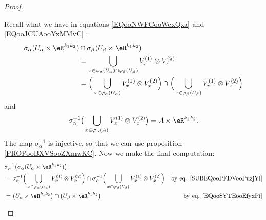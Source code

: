 \begin{proof}
\begin{subproof}
\begin{subproof}
			Recall what we have in equations \eqref{EQooNWFCooWcxQxa} and \eqref{EQooJCUAooYxMMvC} :
			\begin{subequations}
				\begin{align}
					\sigma_{\alpha}(U_{\alpha}\times \eR^{k_1k_2}) & \cap \sigma_{\beta}(U_{\beta}\times \eR^{k_1k_2})                                                                                                                                                  \\
					                                               & =\bigcup_{x\in \varphi_{\alpha}(U_{\alpha})\cap \varphi_{\beta}(U_{\beta})}V_x^{(1)}\otimes V_x^{(2)}                                                                                              \\
					                                               & = \Big( \bigcup_{x\in \varphi_{\alpha}(U_{\alpha})}V_x^{(1)}\otimes V_x^{(2)} \Big)\cap\Big( \bigcup_{x\in \varphi_{\beta}(U_{\beta})}V_x^{(1)}\otimes V_x^{(2)}  \Big)		\label{SUBEQooPFDVooPuzjYl}
				\end{align}
			\end{subequations}
			and
			\begin{equation}		\label{EQooSYTEooEfyxPi}
				\sigma_{\alpha}^{-1}\big( \bigcup_{x\in \varphi_{\alpha}(A)}V_x^{(1)}\otimes V_x^{(2)} \big)    =A\times \eR^{k_1k_2}.
			\end{equation}
			The map \( \sigma_{\alpha}^{-1}\) is injective, so that we can use proposition \ref{PROPooBXVSooZXmwKC}. Now we make the final computation:
			\begin{subequations}
				\begin{align}
					 & \sigma_{\alpha}^{-1}\big( \sigma_{\alpha}(U_{\alpha}\times \eR^{k_1k_2})  \big)                                                                                                                                                                                    \\
					 & = \sigma_{\alpha}^{-1}\Big(  \bigcup_{x\in \varphi_{\alpha}(U_{\alpha})}V_x^{(1)}\otimes V_x^{(2)}  \Big) \cap   \sigma_{\alpha}^{-1}\Big(  \bigcup_{x\in \varphi_{\beta}(U_{\beta})}V_x^{(1)}\otimes V_x^{(2)}  \Big) & \text{by eq. \eqref{SUBEQooPFDVooPuzjYl}} \\
					 & = \big( U_{\alpha}\times \eR^{k_1k_2} \big) \cap \big( U_{\beta}\times \eR^{k_1k_2} \big)                                                                                                                              & \text{by eq. \eqref{EQooSYTEooEfyxPi}}    \\

\end{align}
\end{subequations}
\end{subproof}
\end{subproof}
\end{proof}
